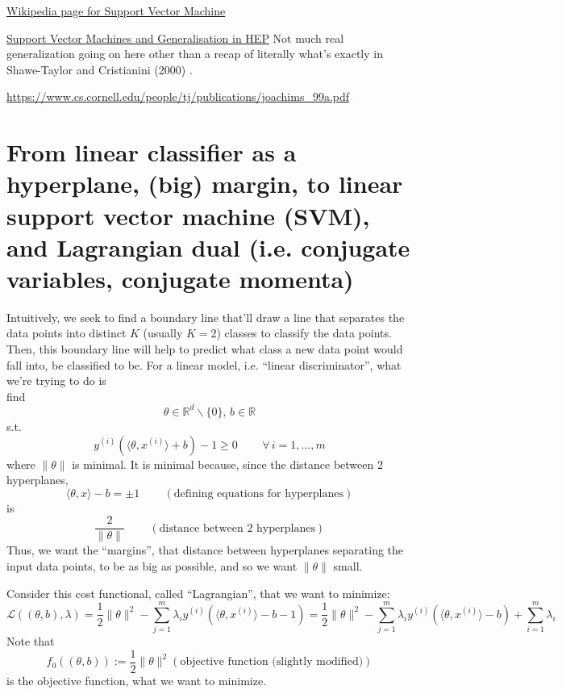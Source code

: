\documentclass[10pt]{amsart}
\begin{document}
\begin{multicols*}{2}
\href{https://en.wikipedia.org/wiki/Support_vector_machine}{Wikipedia page for Support Vector Machine}

\href{https://arxiv.org/pdf/1610.09932.pdf}{Support Vector Machines and Generalisation in HEP} Not much real generalization going on here other than a recap of literally what's exactly in Shawe-Taylor and Cristianini (2000) \cite{STCr2000}.  

\url{https://www.cs.cornell.edu/people/tj/publications/joachims_99a.pdf}

\section{From linear classifier as a hyperplane, (big) margin, to linear support vector machine (SVM), and Lagrangian dual (i.e. conjugate variables, conjugate momenta)}

Intuitively, we seek to find a boundary line that'll draw a line that separates the data points into distinct $K$ (usually $K=2$) classes to classify the data points.  Then, this boundary line will help to predict what class a new data point would fall into, be classified to be.  For a linear model, i.e. ``linear discriminator'', what we're trying to do is \\

find
\[
\theta \in \mathbb{R}^d \backslash \lbrace 0 \rbrace ,\, b\in \mathbb{R}
\]
s.t.
\begin{equation}
  y^{(i)}(\langle \theta,x^{(i)} \rangle + b) - 1 \geq 0 \qquad\, \forall \, i = 1, \dots, m 
\end{equation}
where $\| \theta \|$ is minimal.  It is minimal because, since the distance between 2 hyperplanes,
\[
\langle \theta, x\rangle - b = \pm 1 \qquad \, (\text{defining equations for hyperplanes})
\]
is
\[
\frac{2}{\|\theta\|} \qquad \, (\text{distance between 2 hyperplanes})
\]
Thus, we want the ``margins'', that distance between hyperplanes separating the input data points, to be as big as possible, and so we want $\|\theta\|$ small.

Consider this cost functional, called ``Lagrangian'', that we want to minimize:
\begin{equation}\label{Eq:costLagrangian}
  \mathcal{L}((\theta,b),\lambda) = \frac{1}{2} \| \theta\|^2 - \sum_{j=1}^m \lambda_i y^{(i)}(\langle \theta, x^{(i)} \rangle - b - 1)   =  \frac{1}{2} \| \theta\|^2 - \sum_{j=1}^m \lambda_i y^{(i)}(\langle \theta, x^{(i)} \rangle - b) +\sum_{i=1}^m \lambda_i 
  \end{equation}
Note that
\begin{equation}
f_0((\theta,b)) := \frac{1}{2} \| \theta \|^2 (\text{objective function (slightly modified)})
\end{equation}
is the objective function, what we want to minimize.


\end{multicols*}
\end{document}
